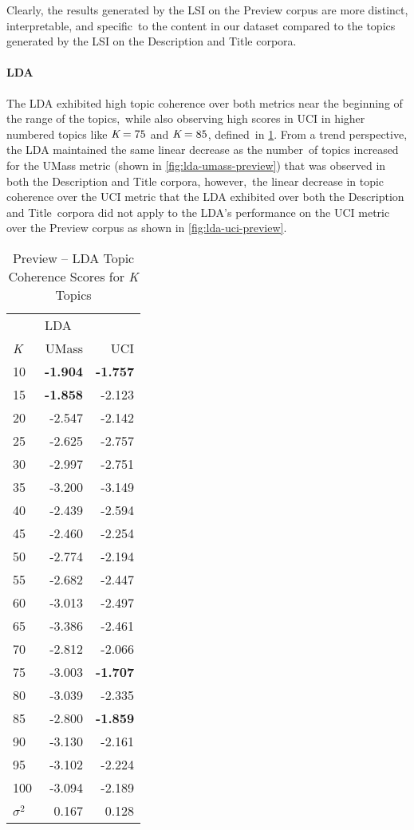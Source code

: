 \documentclass[letterpaper,12pt]{article}
\begin{document}
Clearly, the results generated by the LSI on the Preview corpus are more distinct, interpretable, and specific\
to the content in our dataset compared to the topics generated by the LSI on the Description and Title corpora.
\newpage
\paragraph{LDA}
The LDA exhibited high topic coherence over both metrics near the beginning of the range of the topics,\
while also observing high scores in UCI in higher numbered topics like $\emph{K} = 75$ and $\emph{K} = 85$, defined\
in \ref{tab:lda_preview_tc}. From a trend perspective, the LDA maintained the same linear decrease as the number\
of topics increased for the UMass metric (shown in \ref{fig:lda-umass-preview}) that was observed in both the Description and Title corpora, however,\
the linear decrease in topic coherence over the UCI metric that the LDA exhibited over both the Description and Title\
corpora did not apply to the LDA's performance on the UCI metric over the Preview corpus as shown in \ref{fig:lda-uci-preview}.\

\begin{table}
	\caption{\label{tab:lda_preview_tc} Preview -- LDA Topic Coherence Scores for \emph{K} Topics}
	\begin{center}
		\begin{tabular}{lrr}
			\toprule
			{} & \multicolumn{2}{l}{LDA} \\
			\emph{K} &  UMass &    UCI \\
			\midrule
			10  & \textbf{-1.904} & \textbf{-1.757} \\
			15  & \textbf{-1.858} & -2.123 \\
			20  & -2.547 & -2.142 \\
			25  & -2.625 & -2.757 \\
			30  & -2.997 & -2.751 \\
			35  & -3.200 & -3.149 \\
			40  & -2.439 & -2.594 \\
			45  & -2.460 & -2.254 \\
			50  & -2.774 & -2.194 \\
			55  & -2.682 & -2.447 \\
			60  & -3.013 & -2.497 \\
			65  & -3.386 & -2.461 \\
			70  & -2.812 & -2.066 \\
			75  & -3.003 & \textbf{-1.707} \\
			80  & -3.039 & -2.335 \\
			85  & -2.800 & \textbf{-1.859} \\
			90  & -3.130 & -2.161 \\
			95  & -3.102 & -2.224 \\
			100 & -3.094 & -2.189 \\
			\midrule
			$\sigma^2$ & 0.167 & 0.128 \\
			\bottomrule
			\end{tabular}
	\end{center}
\end{table}
\end{document}

